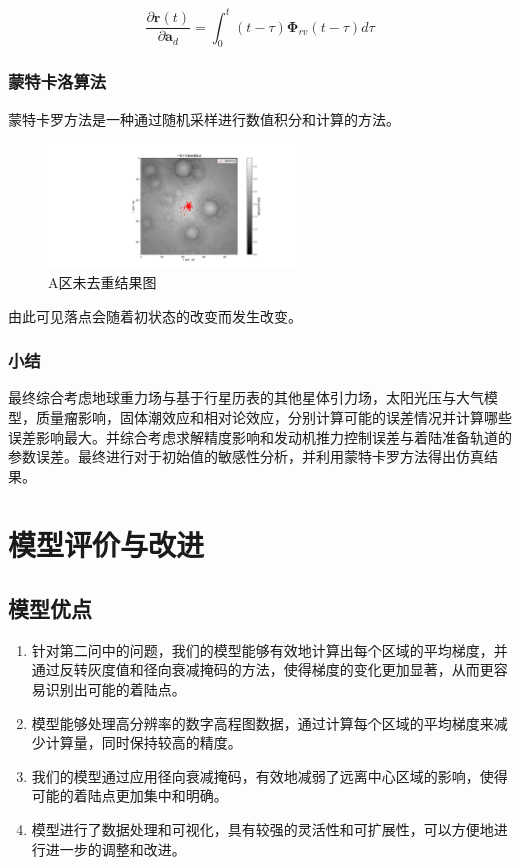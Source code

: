 \documentclass{ctexart}
\begin{document}
\[
\frac{\partial \mathbf{r}(t)}{\partial \mathbf{a}_d} = \int_{0}^{t} (t-\tau) \mathbf{\Phi}_{rv}(t-\tau) d\tau
\]

\subsubsection{蒙特卡洛算法}
蒙特卡罗方法是一种通过随机采样进行数值积分和计算的方法。

    \begin{figure}[H] %
        \centering %
        \includegraphics[width=0.6\textwidth]{"./picture/Figure_100.png"} %
        \caption{A区未去重结果图} %
        \label{fig:example} %
    \end{figure}

由此可见落点会随着初状态的改变而发生改变。

\subsubsection{小结}

最终综合考虑地球重力场与基于行星历表的其他星体引力场，太阳光压与大气模型，质量瘤影响，固体潮效应和相对论效应，分别计算可能的误差情况并计算哪些误差影响最大。并综合考虑求解精度影响和发动机推力控制误差与着陆准备轨道的参数误差。最终进行对于初始值的敏感性分析，并利用蒙特卡罗方法得出仿真结果。

\section{模型评价与改进}

\subsection{模型优点}
\begin{enumerate}[(1)]
    \item 针对第二问中的问题，我们的模型能够有效地计算出每个区域的平均梯度，并通过反转灰度值和径向衰减掩码的方法，使得梯度的变化更加显著，从而更容易识别出可能的着陆点。
    \item 模型能够处理高分辨率的数字高程图数据，通过计算每个区域的平均梯度来减少计算量，同时保持较高的精度。
    \item 我们的模型通过应用径向衰减掩码，有效地减弱了远离中心区域的影响，使得可能的着陆点更加集中和明确。
    \item 模型进行了数据处理和可视化，具有较强的灵活性和可扩展性，可以方便地进行进一步的调整和改进。
\end{enumerate}
\end{document}
